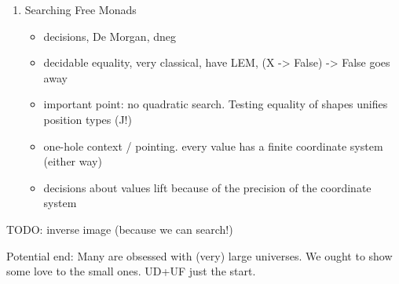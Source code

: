 \documentclass[acmsmall,review,prologue,dvipsnames,bookmarks=false]{acmart}
\begin{document}
\begin{enumerate}
\item Searching Free Monads
\begin{itemize}
\item decisions, De Morgan, dneg
\item decidable equality, very classical, have LEM, (X -> False) -> False goes away
\item important point: no quadratic search. Testing equality of shapes unifies position types (J!)
\item one-hole context / pointing. every value has a finite coordinate system (either way)
\item decisions about values lift because of the precision of the coordinate system
\end{itemize}
\end{enumerate}

TODO: inverse image (because we can search!)

Potential end: Many are obsessed with (very) large universes. We ought to show some love to the small ones.
UD+UF just the start.


\end{document}
